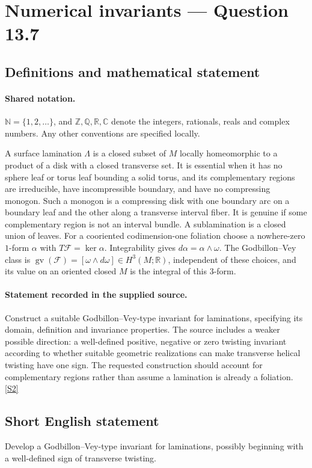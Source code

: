 \documentclass[11pt]{article}
\newcommand{\sref}[2]{\hyperlink{source:#1:#2}{[S#2]}}
\begin{document}
\section{Numerical invariants — Question 13.7}\label{statement}

\subsection{Definitions and mathematical statement}

\paragraph{Shared notation.}$\mathbb N=\{1,2,\ldots\}$, and $\mathbb Z,\mathbb Q,\mathbb R,\mathbb C$ denote the integers, rationals, reals and complex numbers. Any other conventions are specified locally.


A surface lamination $\Lambda$ is a closed subset of $M$ locally homeomorphic to a product of a disk with a closed transverse set. It is essential when it has no sphere leaf or torus leaf bounding a solid torus, and its complementary regions are irreducible, have incompressible boundary, and have no compressing monogon. Such a monogon is a compressing disk with one boundary arc on a boundary leaf and the other along a transverse interval fiber. It is genuine if some complementary region is not an interval bundle. A sublamination is a closed union of leaves. For a cooriented codimension-one foliation choose a nowhere-zero $1$-form $\alpha$ with $T\mathcal F=\ker\alpha$. Integrability gives $d\alpha=\alpha\wedge\omega$. The Godbillon--Vey class is $\operatorname{gv}(\mathcal F)=[\omega\wedge d\omega]\in H^3(M;\mathbb R)$, independent of these choices, and its value on an oriented closed $M$ is the integral of this $3$-form.
\paragraph{Statement recorded in the supplied source.}
Construct a suitable Godbillon--Vey-type invariant for laminations, specifying its domain, definition and invariance properties. The source includes a weaker possible direction: a well-defined positive, negative or zero twisting invariant according to whether suitable geometric realizations can make transverse helical twisting have one sign. The requested construction should account for complementary regions rather than assume a lamination is already a foliation. \sref{statement}{2}
\subsection{Short English statement}
Develop a Godbillon--Vey-type invariant for laminations, possibly beginning with a well-defined sign of transverse twisting.
\end{document}
